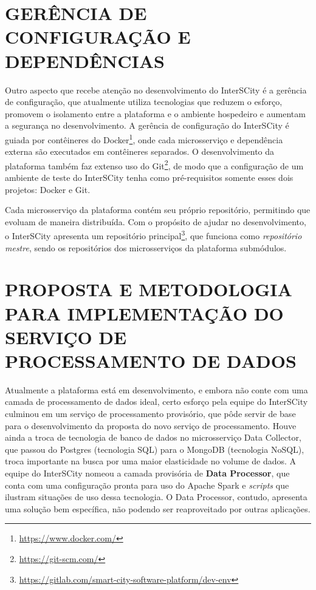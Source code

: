 \section{GERÊNCIA DE CONFIGURAÇÃO E DEPENDÊNCIAS}

Outro aspecto que recebe atenção no desenvolvimento do InterSCity é a gerência
de configuração, que atualmente utiliza tecnologias que reduzem o esforço,
promovem o isolamento entre a plataforma e o ambiente hospedeiro
e aumentam a segurança no desenvolvimento. A gerência de configuração do
InterSCity é guiada por contêineres do
Docker\footnote{\url{https://www.docker.com/}}, onde cada microsserviço e
dependência externa são executados em contêineres separados. O desenvolvimento
da plataforma também faz extenso uso do
Git\footnote{\url{https://git-scm.com/}}, de modo que a configuração de um
ambiente de teste do InterSCity tenha como pré-requisitos somente esses
dois projetos: Docker e Git.

Cada microsserviço da plataforma contém seu próprio repositório, permitindo que
evoluam de maneira distribuída. Com o propósito de ajudar no desenvolvimento,
o InterSCity apresenta um repositório
principal\footnote{\url{https://gitlab.com/smart-city-software-platform/dev-env}},
que funciona como \textit{repositório mestre}, sendo os repositórios dos
microsserviços da plataforma submódulos.

\section{PROPOSTA E METODOLOGIA PARA IMPLEMENTAÇÃO DO SERVIÇO DE PROCESSAMENTO DE DADOS}

Atualmente a plataforma está em desenvolvimento, e embora não conte
com uma camada de processamento de dados ideal, certo esforço pela equipe do
InterSCity culminou em um serviço de processamento provisório, que pôde servir
de base para o desenvolvimento da proposta do novo serviço de processamento. Houve ainda a
troca de tecnologia de banco de dados no microsserviço Data Collector, que
passou do Postgres (tecnologia SQL) para o MongoDB (tecnologia NoSQL), troca
importante na busca por uma maior elasticidade no volume de dados. A equipe
do InterSCity nomeou a camada provisória de \textbf{Data Processor}, que
conta com uma configuração pronta para uso do Apache Spark e
\textit{scripts} que ilustram situações de uso dessa tecnologia. O Data
Processor, contudo, apresenta uma solução bem específica, não podendo ser
reaproveitado por outras aplicações.

